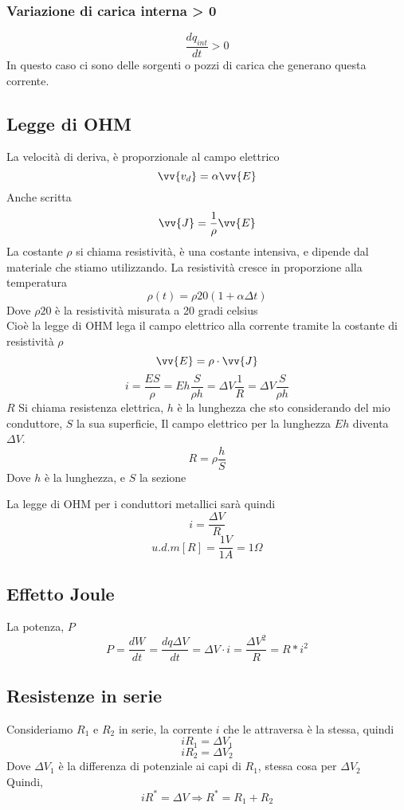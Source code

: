 \documentclass[a4paper]{report}
\begin{document}
  \subsubsection{Variazione di carica interna > 0}
  $$\frac{dq_{int}}{dt} > 0$$
  In questo caso ci sono delle sorgenti o pozzi di carica che generano questa corrente.

  \subsection{Legge di OHM}
  La velocità di deriva, è proporzionale al campo elettrico
  $$ \vv{v_d} = \alpha \vv{E} $$
  Anche scritta
  $$ \vv{J} = \frac{1}{\rho} \vv{E} $$
  La costante $\rho$ si chiama resistività, è una costante intensiva, e dipende dal materiale che stiamo utilizzando.
  La resistività cresce in proporzione alla temperatura
  $$ \rho(t) = \rho{20}(1 + \alpha \Delta t) $$
  Dove $\rho{20}$ è la resistività misurata a 20 gradi celsius\\
  Cioè la legge di OHM lega il campo elettrico alla corrente tramite la costante di resistività $\rho$
  $$ \vv{E} = \rho \cdot \vv{J} $$
  $$ i = \frac{ES}{\rho} = Eh \frac{S}{\rho h} = \Delta V \frac{1}{R} = \Delta V \frac{S}{\rho h} $$
  $R$ Si chiama resistenza elettrica, $h$ è la lunghezza che sto considerando del mio conduttore, $S$ la sua superficie, Il campo elettrico per la lunghezza $Eh$ diventa $\Delta V$.
  $$ R = \rho \frac{h}{S} $$
  Dove $h$ è la lunghezza, e $S$ la sezione

  La legge di OHM per i conduttori metallici sarà quindi
  $$ i = \frac{\Delta V}{R} $$
  $$ u.d.m[R] = \frac{1V}{1A} = 1 \Omega $$

  \subsection{Effetto Joule}
  La potenza, $P$
  $$ P=\frac{dW}{dt} = \frac{dq\Delta V}{dt} = \Delta V \cdot i = \frac{\Delta V^2}{R} = R*i^2$$

  \subsection{Resistenze in serie}
  Consideriamo $R_1$ e $R_2$ in serie, la corrente $i$ che le attraversa è la stessa, quindi
  $$ i R_1 = \Delta V_1 $$
  $$ i R_2 = \Delta V_2 $$
  Dove $\Delta V_1$ è la differenza di potenziale ai capi di $R_1$, stessa cosa per $\Delta V_2$\\
  Quindi,
  $$ i R^* = \Delta V \Rightarrow R^* = R_1 +R_2 $$
\end{document}
